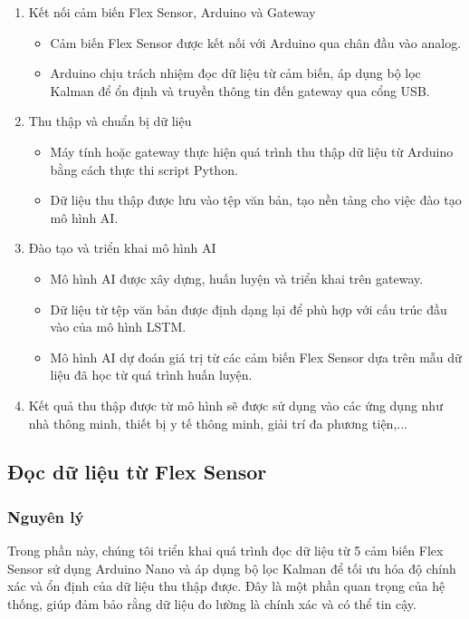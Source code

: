 \begin{enumerate}[-]
    \item Kết nối cảm biến Flex Sensor, Arduino và Gateway 
    \begin{itemize}
        \item Cảm biến Flex Sensor được kết nối với Arduino qua chân đầu vào analog.
        \item Arduino chịu trách nhiệm đọc dữ liệu từ cảm biến, áp dụng bộ lọc Kalman để ổn định và truyền thông tin đến gateway qua cổng USB.
    \end{itemize}
    \item  Thu thập và chuẩn bị dữ liệu
    \begin{itemize}
        \item Máy tính hoặc gateway thực hiện quá trình thu thập dữ liệu từ Arduino bằng cách thực thi script Python.
        \item Dữ liệu thu thập được lưu vào tệp văn bản, tạo nền tảng cho việc đào tạo mô hình AI.
    \end{itemize}
    \item  Đào tạo và triển khai mô hình AI
    \begin{itemize}
        \item Mô hình AI được xây dựng, huấn luyện và triển khai trên gateway.
        \item Dữ liệu từ tệp văn bản được định dạng lại để phù hợp với cấu trúc đầu vào của mô hình LSTM.
        \item Mô hình AI dự đoán giá trị từ các cảm biến Flex Sensor dựa trên mẫu dữ liệu đã học từ quá trình huấn luyện.
    \end{itemize}
    \item Kết quả thu thập được từ mô hình sẽ được sử dụng vào các ứng dụng như nhà thông minh, thiết bị y tế thông minh, giải trí đa phương tiện,...
\end{enumerate}

\subsection{Đọc dữ liệu từ Flex Sensor}

\subsubsection{Nguyên lý}

\indent Trong phần này, chúng tôi triển khai quá trình đọc dữ liệu từ 5 cảm biến Flex Sensor sử dụng Arduino Nano và áp dụng bộ lọc Kalman để tối ưu hóa độ chính xác và ổn định của dữ liệu thu thập được. Đây là một phần quan trọng của hệ thống, giúp đảm bảo rằng dữ liệu đo lường là chính xác và có thể tin cậy.

